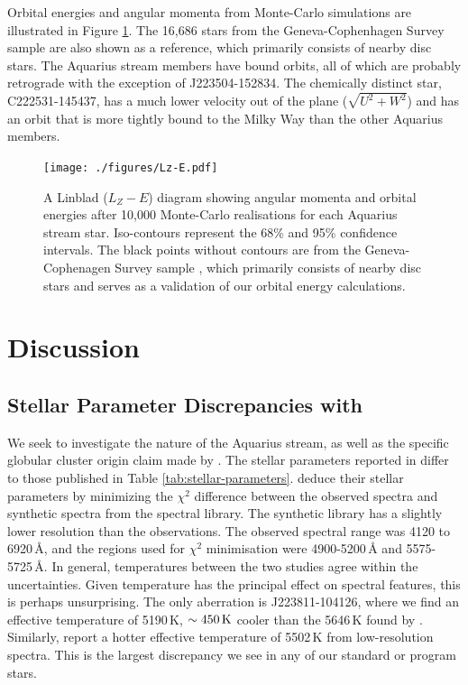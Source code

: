 \documentclass{emulateapj}
\begin{document}
Orbital energies and angular momenta from Monte-Carlo simulations are illustrated in Figure \ref{fig:orbits}. The 16,686 stars from the Geneva-Cophenhagen Survey sample \citep{nordstrom;et-al_2004} are also shown as a reference, which primarily consists of nearby disc stars. The Aquarius stream members have bound orbits, all of which are probably retrograde with the exception of {J223504-152834}. The chemically distinct star, {C222531-145437}, has a much lower velocity out of the plane ($\sqrt{U^2 + W^2}$) and has an orbit that is  more tightly bound to the Milky Way than the other Aquarius members. 

\begin{figure}[h!]
	\texttt{[image: ./figures/Lz-E.pdf]}
	\caption{A Linblad ($L_Z-E$) diagram showing angular momenta and orbital energies after 10,000 Monte-Carlo realisations for each Aquarius stream star. Iso-contours represent the 68\% and 95\% confidence intervals. The black points without contours are from the Geneva-Cophenagen Survey sample \citep{nordstrom;et-al_2004}, which primarily consists of nearby disc stars and serves as a validation of our orbital energy calculations.}
	\label{fig:orbits}
\end{figure}



\section{Discussion}
\label{sec:discussion}


\subsection{Stellar Parameter Discrepancies with \\ \citet{wylie-de-boer;et-al_2012}}

We seek to investigate the nature of the Aquarius stream, as well as the specific globular cluster origin claim made by \citet{wylie-de-boer;et-al_2012}. The stellar parameters reported in \citet{wylie-de-boer;et-al_2012} differ to those published in Table \ref{tab:stellar-parameters}. \citet{wylie-de-boer;et-al_2012} deduce their stellar parameters by minimizing the $\chi^2$ difference between the observed spectra and synthetic spectra from the \citet{munari;et-al_2005} spectral library. The synthetic library has a slightly lower resolution than the observations. The observed spectral range was 4120 to 6920\,{\AA}, and the regions used for $\chi^2$ minimisation were {4900-5200\,\AA} and {5575-5725\,\AA}. In general, temperatures between the two studies agree within the uncertainties. Given temperature has the principal effect on spectral features, this is perhaps unsurprising. The only aberration is {J223811-104126}, where we find an effective temperature of {5190\,K}, {$\sim{}450\,{\rm K}$} cooler than the {5646\,K} found by \citet{wylie-de-boer;et-al_2012}.  Similarly, \citet{williams;et-al_2011} report a hotter effective temperature of {5502\,K} from low-resolution spectra. This is the largest discrepancy we see in any of our standard or program stars.
\end{document}
